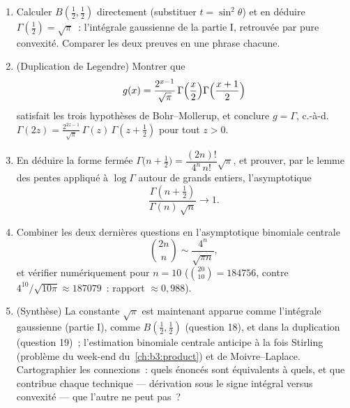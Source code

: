\begin{problem}
\begin{enumerate}[resume]
\[        \]
        pour conclure la \emph{formule d'Euler}~: $B(x, y)
        = \dfrac{\Gamma(x)\Gamma(y)}{\Gamma(x+y)}$ ---
        aucune intégrale double nulle part.
  \item Calculer $B(\frac12, \frac12)$ directement
        (substituer $t = \sin^2\theta$) et en déduire
        $\Gamma(\frac12) = \sqrt\pi$~: l'intégrale
        gaussienne de la partie I, retrouvée par pure
        convexité. Comparer les deux preuves en une phrase
        chacune.
  \item (Duplication de Legendre) Montrer que
        \[
        g(x) = \frac{2^{x-1}}{\sqrt\pi}\,
        \Gamma\Bigl(\frac x2\Bigr)
        \Gamma\Bigl(\frac{x+1}2\Bigr)
        \]
        satisfait les trois hypothèses de Bohr--Mollerup, et
        conclure $g = \Gamma$, c.-à-d.\ $\Gamma(2z) =
        \frac{2^{2z-1}}{\sqrt\pi}\,\Gamma(z)\,\Gamma(z +
        \tfrac12)$ pour tout $z > 0$.
  \item En déduire la forme fermée $\Gamma\bigl(n +
        \tfrac12\bigr) =
        \dfrac{(2n)!}{4^n\,n!}\sqrt\pi$, et prouver, par le
        lemme des pentes appliqué à $\log\Gamma$ autour de
        grands entiers, l'asymptotique
        \[
        \frac{\Gamma(n + \frac12)}{\Gamma(n)\,\sqrt n}
        \longrightarrow 1 .
        \]
  \item Combiner les deux dernières questions en
        l'asymptotique binomiale centrale
        \[
        \binom{2n}{n} \sim \frac{4^n}{\sqrt{\pi n}},
        \]
        et vérifier numériquement pour $n = 10$
        ($\binom{20}{10} = 184756$, contre
        $4^{10}/\sqrt{10\pi} \approx 187079$~: rapport
        $\approx 0{,}988$).
  \item (Synthèse) La constante $\sqrt\pi$ est maintenant
        apparue comme l'intégrale gaussienne (partie I),
        comme $B(\frac12, \frac12)$ (question 18), et dans
        la duplication (question 19)~; l'estimation
        binomiale centrale anticipe à la fois Stirling
        (problème du week-end du~\cref{ch:b3:product}) et de
        Moivre--Laplace. Cartographier les connexions~:
        quels énoncés sont équivalents à quels, et que
        contribue chaque technique --- dérivation sous le
        signe intégral versus convexité --- que l'autre ne
        peut pas~?
\end{enumerate}


\end{problem}

